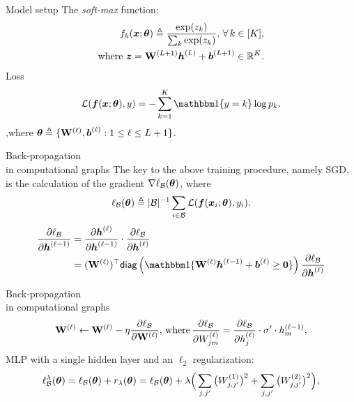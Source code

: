 \documentclass[presentation]{beamer}
\begin{document}
\begin{frame}{Model setup}
    The \textit{soft-max} function:
    \begin{equation}
        \begin{aligned}
            f_k(\text{\boldmath $x$}; \text{\boldmath $\theta$}) \triangleq  \frac{\exp(z_k)}{\sum_k \exp(z_k)}, \, \forall\, k\in[K], \\ \text{where}~ \text{\boldmath $z$} = \mathrm{\bf W}^{(L+1)} \text{\boldmath $h$}^{(L)} + \text{\boldmath $b$}^{(L+1)} \in \mathbb{R}^{K}.
        \end{aligned}
    \end{equation}
    \pause
    Loss
    \begin{equation}\label{eq:crossentropy}
        \mathcal{L}(\ff(\xx; \btheta), y)=-\sum_{k=1}^K \bbone\{y = k\} \log p_k,
    \end{equation}
    ,where $\text{\boldmath $\theta$} \triangleq \{ \mathrm{\bf W}^{(\ell)}, \text{\boldmath $b$}^{(\ell)}: 1\leq \ell \leq L+1\}$.
\end{frame}

\begin{frame}{Back-propagation\\ in computational graphs}
    The key to the above training procedure, namely SGD, is the calculation of the gradient $\nabla \ell_{\mathcal{B}}(\text{\boldmath $\theta$})$, where
    \begin{equation}\label{eq:loss-nn}
        \ell_{\mathcal{B}}(\text{\boldmath $\theta$}) \triangleq |\mathcal{B}|^{-1} \sum_{i \in \mathcal{B}} \mathcal{L}(\text{\boldmath $f$}(\text{\boldmath $x$}_i ; \text{\boldmath $\theta$}), y_i).
    \end{equation}
    \pause
    \begin{equation}\label{eq:grad}
        \begin{aligned}
            \frac{\partial \ell_{\cB}}{\partial \hh^{(\ell-1)}} &=  \frac{\partial \hh^{(\ell)}}{\partial \hh^{(\ell-1)}} \cdot \frac{\partial \ell_{\cB}}{\partial \hh^{(\ell)}} \\
            & = (\bW^{(\ell)})^\top \mathsf{diag}\left( \bbone\{\bW^{(\ell)} \hh^{(\ell-1)} + \bb^{(\ell)}  \ge \bm{0}\}  \right) \frac{\partial \ell_{\cB}}{\partial \hh^{(\ell)}}
        \end{aligned}
    \end{equation}
\end{frame}

\begin{frame}{Back-propagation\\ in computational graphs}
    \begin{equation}\label{eq:Wupdate}
        \mathrm{\bf W}^{(\ell)} \leftarrow \mathrm{\bf W}^{(\ell)} - \eta \frac{\partial \ell_{\mathcal{B}}}{\partial \mathrm{\bf W}^{(\ell)}}, \, \text{where} \, \frac{\partial \ell_{\mathcal{B}}}{\partial W_{jm}^{(\ell)}} = \frac{\partial \ell_{\mathcal{B}}}{\partial h_j^{(\ell)}} \cdot \sigma' \cdot h_m^{(\ell-1)},
    \end{equation}
    \pause
    MLP with a single hidden layer and an $\ell_2$ regularization:
    \begin{equation}\label{eq:regloss}
    \ell_{\mathcal{B}}^\lambda (\text{\boldmath $\theta$}) = \ell_{\mathcal{B}}(\text{\boldmath $\theta$}) + r_\lambda(\text{\boldmath $\theta$}) = \ell_{\mathcal{B}}(\text{\boldmath $\theta$}) + \lambda \Big( \sum_{j,j'} \big(W_{j,j'}^{(1)}\big)^2 + \sum_{j,j'} \big(W_{j,j'}^{(2)}\big)^2 \Big),
    \end{equation}
\end{frame}
\end{document}
